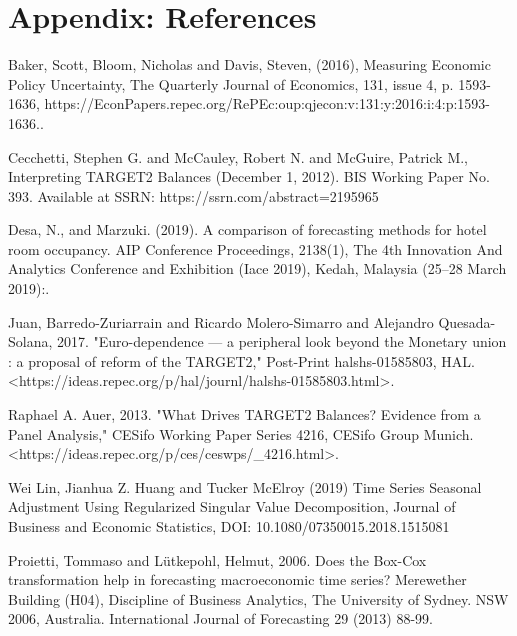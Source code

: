 \documentclass[12pt]{article}
\begin{document}
\singlespacing
\setlength\bibsep{0pt}



\clearpage

\onehalfspacing

\section*{Appendix: References} \label{sec:references}

Baker, Scott, Bloom, Nicholas and Davis, Steven, (2016), Measuring Economic Policy Uncertainty, The Quarterly Journal of Economics, 131, issue 4, p. 1593-1636, https://EconPapers.repec.org/RePEc:oup:qjecon:v:131:y:2016:i:4:p:1593-1636..

Cecchetti, Stephen G. and McCauley, Robert N. and McGuire, Patrick M., Interpreting TARGET2 Balances (December 1, 2012). BIS Working Paper No. 393. Available at SSRN: https://ssrn.com/abstract=2195965 

Desa, N., and Marzuki. (2019). A comparison of forecasting methods for hotel room occupancy. AIP Conference Proceedings, 2138(1), The 4th Innovation And Analytics Conference and Exhibition (Iace 2019), Kedah, Malaysia (25–28 March 2019):.

Juan, Barredo-Zuriarrain and Ricardo Molero-Simarro and Alejandro Quesada-Solana, 2017. "Euro-dependence — a peripheral look beyond the Monetary union : a proposal of reform of the TARGET2," Post-Print halshs-01585803, HAL. <https://ideas.repec.org/p/hal/journl/halshs-01585803.html>. 

Raphael A. Auer, 2013. "What Drives TARGET2 Balances? Evidence from a Panel Analysis," CESifo Working Paper Series 4216, CESifo Group Munich. <https://ideas.repec.org/p/ces/ceswps/\_4216.html>. 

Wei Lin, Jianhua Z. Huang and Tucker McElroy (2019) Time Series Seasonal Adjustment Using Regularized Singular Value Decomposition, Journal of Business and Economic Statistics, DOI: 10.1080/07350015.2018.1515081

Proietti, Tommaso and Lütkepohl, Helmut, 2006. Does the Box-Cox transformation help in forecasting macroeconomic time series? Merewether Building (H04), Discipline of Business Analytics, The University of Sydney. NSW 2006, Australia. International Journal of Forecasting 29 (2013) 88-99. 
\end{document}
